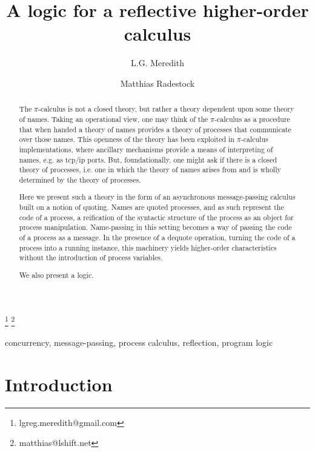 \documentclass[]{entcs}
\newcommand{\pic}{$\pi$-calculus}
\begin{document}
\begin{frontmatter}
	\title{A logic for a reflective higher-order calculus}

	\author{ L.G. Meredith  }
	\address{ CTO, Djinnisys Corporation\\ 505 N72nd St, Seattle, WA 98103 }
	\author{ Matthias Radestock  }	
	\address{ CTO, LShift, Ltd.\\ 6 Rufus St, London N1 6PE }
	\thanks[lgmemail]{ lgreg.meredith@gmail.com }
	\thanks[mremail]{ matthias@lshift.net }


	\begin{abstract}
	The {\pic} is not a closed theory, but rather a theory dependent upon
	some theory of names. Taking an operational view, one may think of the
	{\pic} as a procedure that when handed a theory of names provides
	a theory of processes that communicate over those names. This openness
	of the theory has been exploited in {\pic} implementations, where
	ancillary mechanisms provide a means of interpreting of names, e.g. as
	tcp/ip ports. But, foundationally, one might ask if there is a closed
	theory of processes, i.e. one in which the theory of names arises from
	and is wholly determined by the theory of processes.
	
	Here we present such a theory in the form of an asynchronous
	message-passing calculus built on a notion of quoting. Names are
	quoted processes, and as such represent the code of a process, a
	reification of the syntactic structure of the process as an object for
	process manipulation. Name-passing in this setting becomes a way of
	passing the code of a process as a message. In the presence of a
	dequote operation, turning the code of a process into a running
	instance, this machinery yields higher-order characteristics without
	the introduction of process variables.

	We also present a logic.
	\end{abstract}

	\begin{keyword}
		concurrency, message-passing, process calculus, reflection, program logic
	\end{keyword}

\end{frontmatter}

\section{Introduction}
\end{document}
